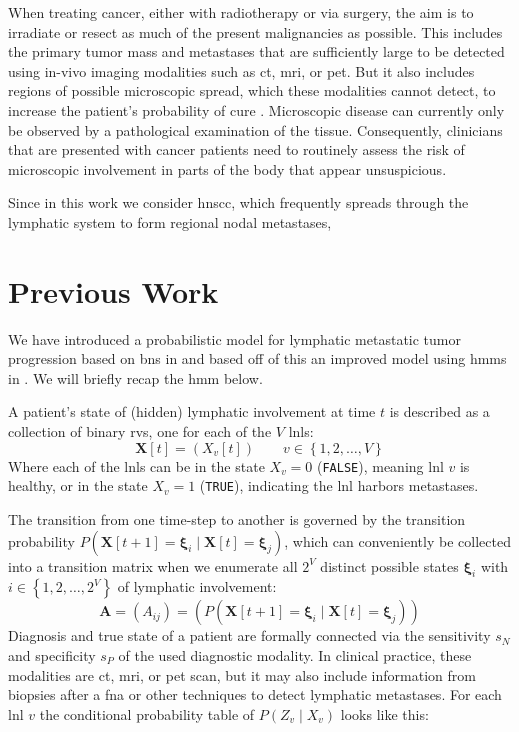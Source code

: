 \documentclass[twocolumn]{aastex631}
\begin{document}
When treating cancer, either with radiotherapy or via surgery, the aim is to irradiate or resect as much of the present malignancies as possible. This includes the primary tumor mass and metastases that are sufficiently large to be detected using in-vivo imaging modalities such as \gls{ct}, \gls{mri}, or \gls{pet}. But it also includes regions of possible microscopic spread, which these modalities cannot detect, to increase the patient's probability of cure \cite{poortmans_internal_2020,murthy_prostate-only_2021}. Microscopic disease can currently only be observed by a pathological examination of the tissue. Consequently, clinicians that are presented with cancer patients need to routinely assess the risk of microscopic involvement in parts of the body that appear unsuspicious.

Since in this work we consider \gls{hnscc}, which frequently spreads through the lymphatic system to form regional nodal metastases, 

\section{Previous Work}
\label{sec:previous_work}

We have introduced a probabilistic model for lymphatic metastatic tumor progression based on \glspl{bn} in \cite{pouymayou_bayesian_2019} and based off of this an improved model using \glspl{hmm} in \cite{ludwig_hidden_2021}. We will briefly recap the \acrlong{hmm} below.

A patient's state of (hidden) lymphatic involvement at time $t$ is described as a collection of binary \glspl{rv}, one for each of the $V$ \glspl{lnl}:
%
\begin{equation}
    \mathbf{X}[t] = \left( X_v[t] \right) \qquad v \in \left\{ 1,2, \ldots, V \right\}
\end{equation}
%
Where each of the \glspl{lnl} can be in the state $X_v=0$ (\texttt{FALSE}), meaning \gls{lnl} $v$ is healthy, or in the state $X_v=1$ (\texttt{TRUE}), indicating the \gls{lnl} harbors metastases.

The transition from one time-step to another is governed by the transition probability $P\left( \mathbf{X}[t+1]=\boldsymbol{\xi}_i \mid \mathbf{X}[t]=\boldsymbol{\xi}_j \right)$, which can conveniently be collected into a transition matrix when we enumerate all $2^V$ distinct possible states $\boldsymbol{\xi}_i$ with $i \in \left\{ 1,2, \ldots, 2^V \right\}$ of lymphatic involvement:
%
\begin{equation}
    \mathbf{A} = \left( A_{ij} \right) = \left( P\left( \mathbf{X}[t+1]=\boldsymbol{\xi}_i \mid \mathbf{X}[t]=\boldsymbol{\xi}_j \right) \right)
\end{equation}
%
Diagnosis and true state of a patient are formally connected via the sensitivity $s_N$ and specificity $s_P$ of the used diagnostic modality. In clinical practice, these modalities are \gls{ct}, \gls{mri}, or \gls{pet} scan, but it may also include information from biopsies after a \gls{fna} or other techniques to detect lymphatic metastases. For each \gls{lnl} $v$ the conditional probability table of $P\left( Z_v \mid X_v \right)$ looks like this:
\end{document}
